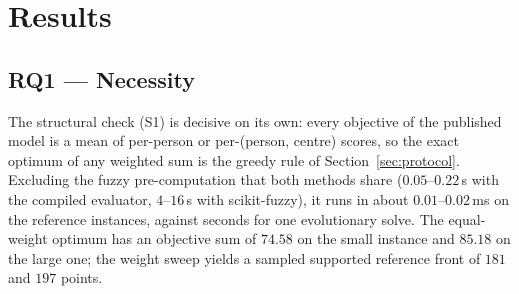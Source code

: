 \documentclass[systems,article,submit,moreauthors,pdftex]{Definitions/mdpi}
\begin{document}
\section{Results}\label{sec:results}

\subsection{RQ1 --- Necessity}\label{sec:rq1}
The structural check (S1) is decisive on its own: every objective of the published model
is a mean of per-person or per-(person, centre) scores, so the exact optimum of any
weighted sum is the greedy rule of Section~\ref{sec:protocol}. Excluding the fuzzy
pre-computation that both methods share ($0.05$--$0.22$\,s with the compiled evaluator,
$4$--$16$\,s with scikit-fuzzy), it runs in
about $0.01$--$0.02$\,ms on the reference instances, against seconds for one evolutionary
solve.
The equal-weight optimum has an objective sum of $74.58$ on the small instance and $85.18$
on the large one; the weight sweep yields a sampled supported reference front of $181$ and
$197$ points.
\end{document}
